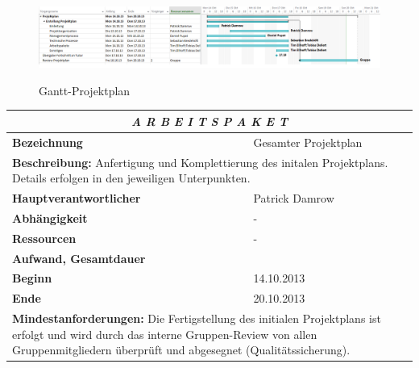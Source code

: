 \documentclass[fontsize=12pt,paper=a4,twoside]{scrartcl}
\begin{document}
\begin{figure}[htbp]
\caption{Gantt-Projektplan}
\includegraphics[angle= 90, scale=0.56]{Gantt-Projektplan2.png}
\newline
\label{Gantt-Projektplan2}
\end{figure}


\begin{tabular}{p{7.5cm}|p{7.5cm}}\toprule
\multicolumn{2}{c}{\textbf{\textit{A R B E I T S P A K E T \quad 1}}} \\ \toprule \hline
\textbf{Bezeichnung} & Gesamter Projektplan\\\hline
\multicolumn{2}{p{15cm}}{\textbf{Beschreibung:} \newline 
Anfertigung und Komplettierung des initalen Projektplans. Details erfolgen in den jeweiligen Unterpunkten.}  \\\hline
\textbf{Hauptverantwortlicher} & Patrick Damrow\\\hline
\textbf{Abhängigkeit} & -\\\hline
\textbf{Ressourcen} & -\\\hline
\textbf{Aufwand, Gesamtdauer} & \\\hline
\textbf{Beginn} & 14.10.2013 \\\hline
\textbf{Ende} & 20.10.2013\\\hline
\multicolumn{2}{p{15cm}}{\textbf{Mindestanforderungen: } \newline
Die Fertigstellung des initialen Projektplans ist erfolgt und wird durch das interne Gruppen-Review von allen Gruppenmitgliedern überprüft und abgesegnet (Qualitätssicherung).}  \\ \toprule
\end{tabular} \\\\
\end{document}
